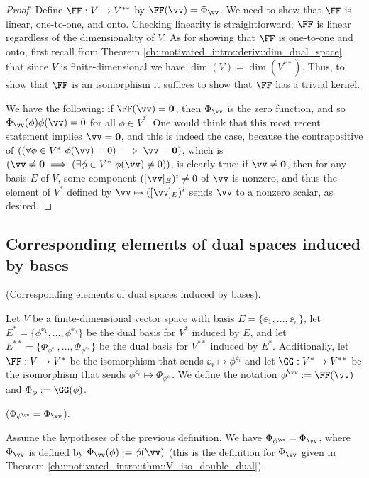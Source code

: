 \begin{proof}
    Define $\FF:V \rightarrow V^{**}$ by $\FF(\vv) = \Phi_\vv$. We need to show that $\FF$ is linear, one-to-one, and onto. Checking linearity is straightforward; $\FF$ is linear regardless of the dimensionality of $V$. As for showing that $\FF$ is one-to-one and onto, first recall from Theorem \ref{ch::motivated_intro::deriv::dim_dual_space} that since $V$ is finite-dimensional we have $\dim(V) = \dim(V^{**})$. Thus, to show that $\FF$ is an isomorphism it suffices to show that $\FF$ has a trivial kernel.
    
    We have the following: if $\FF(\vv) = \mathbf{0}$, then $\Phi_\vv$ is the zero function, and so $\Phi_\vv(\phi) \phi(\vv) = 0$ for all $\phi \in V^*$. One would think that this most recent statement implies $\vv = \mathbf{0}$, and this is indeed the case, because the contrapositive of $((\forall \phi \in V^* \spc \phi(\vv) = 0) \implies \vv = \mathbf{0})$, which is $(\vv \neq \mathbf{0} \implies (\exists \phi \in V^* \spc \phi(\vv) \neq 0))$, is clearly true: if $\vv \neq \mathbf{0}$, then for any basis $E$ of $V$, some component $([\vv]_E)^i \neq 0$ of $\vv$ is nonzero, and thus the element of $V^*$ defined by $\vv \mapsto ([\vv]_E)^i$ sends $\vv$ to a nonzero scalar, as desired.
\end{proof}

\subsection*{Corresponding elements of dual spaces induced by bases}

\begin{defn}
    (Corresponding elements of dual spaces induced by bases).
    
    Let $V$ be a finite-dimensional vector space with basis $E = \{\ee_1, ..., \ee_n\}$, let $E^* = \{\phi^{\ee_1}, ..., \phi^{\ee_n}\}$ be the dual basis for $V^*$ induced by $E$, and let $E^{**} = \{\Phi_{\phi^{\ee_1}}, ..., \Phi_{\phi^{\ee_n}}\}$ be the dual basis for $V^{**}$ induced by $E^*$. Additionally, let $\FF:V \rightarrow V^*$ be the isomorphism that sends $\ee_i \mapsto \phi^{\ee_i}$ and let $\GG:V^* \rightarrow V^{**}$ be the isomorphism that sends $\phi^{\ee_i} \mapsto \Phi_{\phi^{\ee_i}}$. We define the notation $\phi^\vv := \FF(\vv)$ and $\Phi_\phi := \GG(\phi)$.
\end{defn}

\begin{theorem}
    \label{ch::motivated_intro::thm::Phiphiv_eq_Phiv}
    ($\Phi_{\phi^\vv} = \Phi_\vv$).

    Assume the hypotheses of the previous definition. We have $\Phi_{\phi^\vv} = \Phi_\vv$, where $\Phi_\vv$ is defined by $\Phi_\vv(\phi) := \phi(\vv)$ (this is the definition for $\Phi_\vv$ given in Theorem \ref{ch::motivated_intro::thm::V_iso_double_dual}).
\end{theorem}


